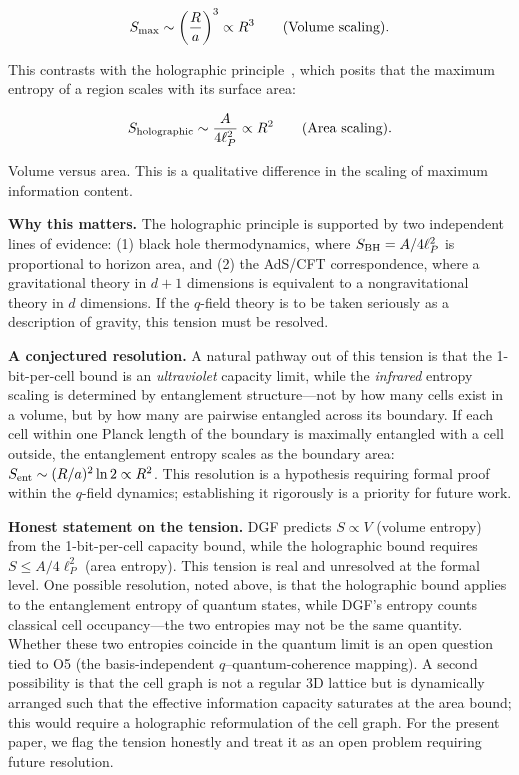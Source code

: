 \documentclass[aps,prd,twocolumn,showpacs,superscriptaddress,preprintnumbers]{revtex4-2}
\begin{document}
\begin{equation}
S_{\rm max} \sim \left(\frac{R}{a}\right)^3 \propto R^3 \qquad \text{(Volume scaling)}.
\label{eq:volume_scaling}
\end{equation}

This contrasts with the holographic principle~\cite{tHooft:1993,Susskind:1994vu}, which posits that the maximum entropy of a region scales with its surface area:

\begin{equation}
S_{\rm holographic} \sim \frac{A}{4\ell_P^2} \propto R^2 \qquad \text{(Area scaling)}.
\label{eq:area_scaling}
\end{equation}

Volume versus area. This is a qualitative difference in the scaling of maximum information content.

\textbf{Why this matters.}
The holographic principle is supported by two independent lines of evidence:
(1) black hole thermodynamics, where $S_{\rm BH}=A/4\ell_P^2$ is proportional to horizon area, and
(2) the AdS/CFT correspondence, where a gravitational theory in $d+1$ dimensions is equivalent to a nongravitational theory in $d$ dimensions.
If the $q$-field theory is to be taken seriously as a description of gravity, this tension must be resolved.

\textbf{A conjectured resolution.}
A natural pathway out of this tension is that the 1-bit-per-cell bound is an \emph{ultraviolet} capacity limit, while the \emph{infrared} entropy scaling is determined by entanglement structure---not by how many cells exist in a volume, but by how many are pairwise entangled across its boundary.
If each cell within one Planck length of the boundary is maximally entangled with a cell outside, the entanglement entropy scales as the boundary area: $S_{\rm ent}\sim(R/a)^2\ln 2\propto R^2$.
This resolution is a hypothesis requiring formal proof within the $q$-field dynamics; establishing it rigorously is a priority for future work.

\textbf{Honest statement on the tension.}
DGF predicts $S \propto V$ (volume entropy) from the 1-bit-per-cell capacity bound, while the holographic bound requires $S \leq A/4\ell_P^2$ (area entropy).
This tension is real and unresolved at the formal level.
One possible resolution, noted above, is that the holographic bound applies to the entanglement entropy of quantum states, while DGF's entropy counts classical cell occupancy---the two entropies may not be the same quantity.
Whether these two entropies coincide in the quantum limit is an open question tied to O5 (the basis-independent $q$--quantum-coherence mapping).
A second possibility is that the cell graph is not a regular 3D lattice but is dynamically arranged such that the effective information capacity saturates at the area bound; this would require a holographic reformulation of the cell graph.
For the present paper, we flag the tension honestly and treat it as an open problem requiring future resolution.
\end{document}
